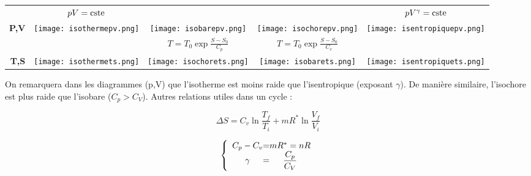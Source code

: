 \documentclass[11pt]{article}
\begin{document}
\begin{table}[!h]
\begin{center}
\begin{tabular}{|r|c|c|c|c|}
  \hline


  &$pV=\textup{cste} $
  &
  &
  &$pV^\gamma=\textup{cste}$
  \\

  \textbf{P,V}
     & \texttt{[image: isothermepv.png]}
     & \texttt{[image: isobarepv.png]}
     & \texttt{[image: isochorepv.png]}
     & \texttt{[image: isentropiquepv.png]}\\


     \hline

     &
  & $T = T_0 \exp{\frac{S-S_0}{C_p}}$
  & $T = T_0 \exp{\frac{S-S_0}{C_v}}$
  &
  \\

  \textbf{T,S}
     & \texttt{[image: isothermets.png]}
     & \texttt{[image: isochorets.png]}
     & \texttt{[image: isobarets.png]}
     & \texttt{[image: isentropiquets.png]}\\



  \hline

\end{tabular}
\end{center}
\end{table}

On remarquera dans les diagrammes (p,V) que l'isotherme est moins raide que l'isentropique (exposant $\gamma$). De manière similaire, l'isochore est plus raide que l'isobare ($C_p > C_V$).
Autres relations utiles dans un cycle :

$$\displaystyle\Delta S = C_v \ln \frac{T_f}{T_i} + m R^* \ln\frac{V_f}{V_i}$$

\[
\left \{
\begin{array}{c @{ = } c}
    C_p - C_v & mR^*=nR \\
    \gamma & \displaystyle\frac{C_p}{C_V} \\
\end{array}
\right.
\]
\end{document}
